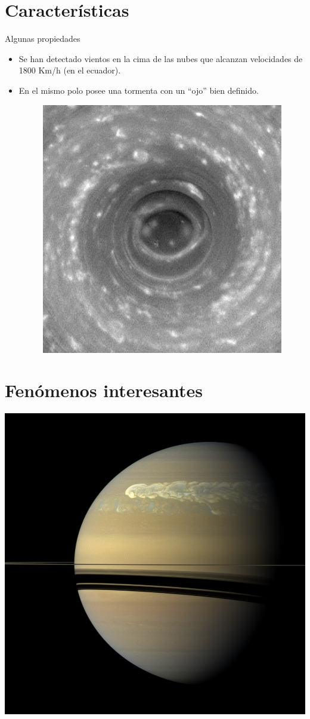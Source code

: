 \documentclass{beamer}
\begin{document}
\section{Características}
\begin{frame}{Algunas propiedades}


    \begin{itemize}
        \item Se han detectado vientos en la cima de las nubes que alcanzan velocidades de 1800 Km/h (en el ecuador).
        \item En el mismo polo posee una tormenta con un ``ojo'' bien definido.
            \vspace{3mm}
    \begin{figure}
        \centering
        \includegraphics[width=0.35\linewidth]{polar_vortex}
    \end{figure}

    \end{itemize}

\end{frame}


\section{Fenómenos interesantes}
\begin{frame}
    \centering
    \includegraphics[width=0.7\linewidth]{gws}
\end{frame}
\end{document}
